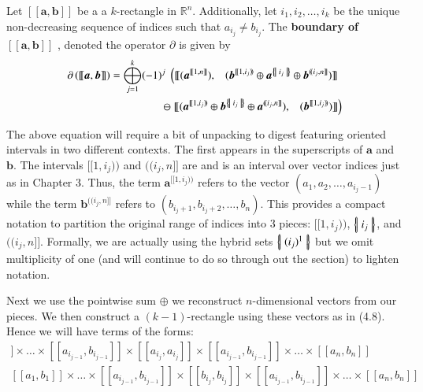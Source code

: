 \begin{definition}
	Let  $[\![\boldsymbol{a}, \boldsymbol{b}]\!]$ be a a $k$-rectangle in $\mathbb{R}^n$.
	Additionally, let $i_1, i_2, \ldots, i_k$ be the unique non-decreasing sequence of indices such that $a_{i_j} \neq b_{i_j}$.
	The \textbf{boundary of $ \boldsymbol{[\![ a,b ]\!]} $ }, denoted the operator $\partial$ is given by
	\begin{align}
		\partial \left( [\![ \boldsymbol{a}, \boldsymbol{b} ]\!] \right) 
		= \bigoplus_{j=1}^k (-1)^j \;
			\left(	
				[\![ 	(\boldsymbol{a}^{[\![1,n]\!]}), 
					\;\;\;
					(\boldsymbol{b}^{[\![1,i_j)\!)} 
						\oplus \boldsymbol{a}^{\hset{i_j}}
						\oplus \boldsymbol{b}^{(\!(i_j,n]\!]}) 
				]\!] \right.\;
			\notag\\
			\ominus \left.
				[\![ 	(\boldsymbol{a}^{[\![1,i_j)\!)}
						\oplus \boldsymbol{b}^{\hset{i_j}}
						\oplus \boldsymbol{a}^{(\!(i_j, n]\!]}), 
					\;\;\;		 
					(\boldsymbol{b}^{[\![1,i_j)\!)}) 			
				]\!]
			\right)
	\end{align}
\end{definition}


The above equation will require a bit of unpacking to digest featuring oriented intervals in two different contexts.
The first appears in the superscripts of $\boldsymbol{a}$ and $\boldsymbol{b}$. 
The intervals $[\![1, i_j)\!)$ and $(\!(i_j, n]\!]$ are  and is an interval over vector indices just as in Chapter 3.
Thus, the term $\boldsymbol{a}^{[\![1,i_j)\!)}$ refers to the vector $(a_1, a_2, \ldots, a_{i_j-1})$ 
while the term $\boldsymbol{b}^{(\!(i_j,n]\!]}$ refers to $(b_{i_j+1}, b_{i_j+2}, \ldots, b_{n})$.
This provides a compact notation to partition the original range of indices into 3 pieces: $[\![ 1,i_j )\!)$, $\left\{ \! \left| \; i_j \; \right| \! \right\}$, and $(\!(i_j, n]\!]$.
Formally, we are actually using the hybrid sets $\left\{ \! \left| \; (i_j)^1 \; \right| \! \right\}$ but we omit multiplicity of one (and will continue to do so through out the section) to lighten notation.


Next we use the pointwise sum $\oplus$ we reconstruct $n$-dimensional vectors from our pieces.
We then construct a $(k-1)$-rectangle using these vectors as in (4.8).
Hence we will have terms of the forms:
\begin{align}
	[\![a_1, b_1]\!]
	\times \ldots \times
	[\![a_{i_{j-1}}, b_{i_{j-1}}]\!]
	\times
	[\![a_{i_j}, a_{i_j}]\!]
	\times
	[\![a_{i_{j-1}}, b_{i_{j-1}}]\!]
	\times \ldots \times
	[\![a_n, b_n]\!]
	\\
	[\![a_1, b_1]\!]
	\times \ldots \times
	[\![a_{i_{j-1}}, b_{i_{j-1}}]\!]
	\times
	[\![b_{i_j}, b_{i_j}]\!]
	\times
	[\![a_{i_{j-1}}, b_{i_{j-1}}]\!]
	\times \ldots \times
	[\![a_n, b_n]\!]
\end{align}


